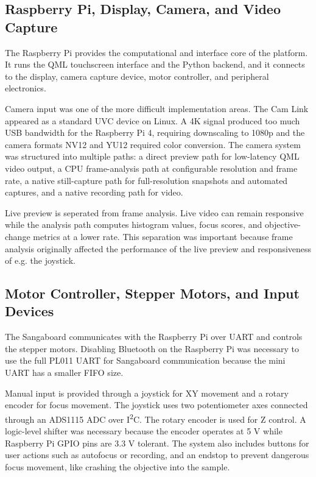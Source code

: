 \subsection{Raspberry Pi, Display, Camera, and Video Capture}

The Raspberry Pi provides the computational and interface core of the platform. It runs the QML touchscreen interface and the Python backend, and it connects to the display, camera capture device, motor controller, and peripheral electronics.

Camera input was one of the more difficult implementation areas. The Cam Link appeared as a standard UVC device on Linux. A 4K signal produced too much USB bandwidth for the Raspberry Pi 4, requiring downscaling to 1080p and the camera formats NV12 and YU12 required color conversion. The camera system was structured into multiple paths: a direct preview path for low-latency QML video output, a CPU frame-analysis path at configurable resolution and frame rate, a native still-capture path for full-resolution snapshots and automated captures, and a native recording path for video.

Live preview is seperated from frame analysis. Live video can remain responsive while the analysis path computes histogram values, focus scores, and objective-change metrics at a lower rate. This separation was important because frame analysis originally affected the performance of the live preview and responsiveness of e.g. the joystick.

\subsection{Motor Controller, Stepper Motors, and Input Devices}

The Sangaboard communicates with the Raspberry Pi over UART and controls the stepper motors. Disabling Bluetooth on the Raspberry Pi was necessary to use the full PL011 UART for Sangaboard communication because the mini UART has a smaller FIFO size.

Manual input is provided through a joystick for XY movement and a rotary encoder for focus movement. The joystick uses two potentiometer axes connected through an ADS1115 ADC over I\textsuperscript{2}C. The rotary encoder is used for Z control. A logic-level shifter was necessary because the encoder operates at 5 V while Raspberry Pi GPIO pins are 3.3 V tolerant. The system also includes buttons for user actions such as autofocus or recording, and an endstop to prevent dangerous focus movement, like crashing the objective into the sample.

